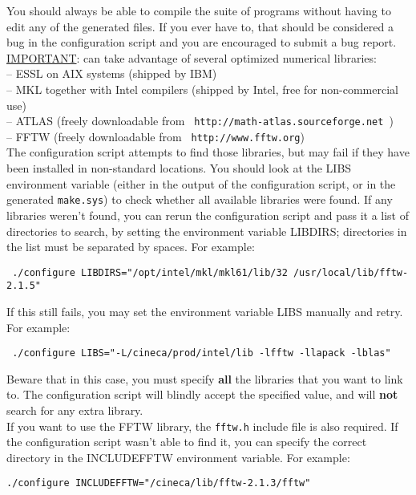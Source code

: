 \noindent You should always be able to compile the \WANT{} suite of
programs without having to edit any of the generated files.  If
you ever have to, that should be considered a bug in the
configuration script and you are encouraged to submit a bug
report.\\

\noindent \underline {IMPORTANT}: \WANT{} can take advantage of
several
optimized numerical libraries:\\
\noindent -- ESSL on AIX systems (shipped by IBM)\\
\noindent -- MKL together with Intel compilers (shipped by Intel,
free for non-commercial use)\\
\noindent -- ATLAS (freely downloadable from
   \texttt{ http://math-atlas.sourceforge.net })\\
\noindent -- FFTW (freely downloadable from
   \texttt{ http://www.fftw.org})\\

\noindent The configuration script attempts to find those
libraries, but may fail if they have been installed in
non-standard locations. You should look at the LIBS environment
variable (either in the output of the configuration script, or in
the generated {\tt make.sys}) to check whether all available
libraries were found.
If any libraries weren't found, you can rerun the
configuration script and pass it a list of directories to search,
by setting the environment variable LIBDIRS; directories in the
list must be
separated by spaces.  For example:
%
%
\begin{description}
  \item \texttt{ ./configure LIBDIRS="/opt/intel/mkl/mkl61/lib/32
  /usr/local/lib/fftw-2.1.5" }
\end{description}
%
%

\noindent If this still fails, you may set the environment
variable LIBS manually and retry.  For example:
%
%
\begin{description}
  \item \texttt{ ./configure LIBS="-L/cineca/prod/intel/lib -lfftw -llapack
  -lblas" }
\end{description}
%
%

\noindent Beware that in this case, you must specify \textbf{all} the
libraries that you want to link to.  The configuration script will
blindly accept the specified value, and will \textbf{not} search for any
extra library.\\

\noindent If you want to use the FFTW library, the \texttt{fftw.h}
include file is also required.  If the configuration script wasn't
able to find it, you can specify the correct directory in the
INCLUDEFFTW environment variable. For example:
%
%
\begin{description}
  \item {\tt ./configure INCLUDEFFTW="/cineca/lib/fftw-2.1.3/fftw" }
\end{description}
%
%

